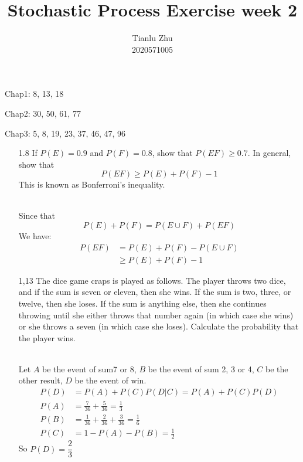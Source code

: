 \documentclass[en,hazy,blue,12pt,device = normal]{elegantnote}
\title{Stochastic Process Exercise week 2}
\author{Tianlu Zhu \\ 2020571005}
\date{}
\begin{document}
\maketitle
Chap1: 8, 13, 18

   Chap2: 30, 50, 61, 77

   Chap3: 5, 8, 19, 23, 37, 46, 47, 96

\begin{enumerate}
    \item[1.8] If $P(E)=0.9$ and $P(F)=0.8$, show that $P(E F) \geq 0.7$. In general, show that
    $$
    P(E F) \geq P(E)+P(F)-1
    $$
    This is known as Bonferroni's inequality.
    \begin{tcolorbox}
        \sol\\
        Since that \[P(E) + P(F) = P(E\cup F) + P(EF)\]
        We have:
        \begin{align*}
            P(EF)&=P(E) + P(F) - P(E\cup F)\\
            &\geq P(E) + P(F) - 1
        \end{align*}
    \end{tcolorbox}

    \item[1,13] The dice game craps is played as follows. The player throws two dice, and if the sum is seven or eleven, then she wins. If the sum is two, three, or twelve, then she loses. If the sum is anything else, then she continues throwing until she either throws that number again (in which case she wins) or she throws a seven (in which case she loses). Calculate the probability that the player wins.
    \begin{tcolorbox}
        \sol \\
        Let \(A\) be the event of sum7 or 8, \(B\) be the event of sum 2, 3 or 4, \(C\) be the other result, \(D\) be the event of win.
        \begin{align*}
            P(D) &= P(A) + P(C) P(D|C) = P(A) + P(C)P(D)\\
            P(A) &= \frac{7}{36} + \frac{5}{36} = \frac{1}{3}\\
            P(B) &= \frac{1}{36} + \frac{2}{36} + \frac{3}{36} = \frac{1}{6}\\
            P(C) &= 1-P(A)-P(B) = \frac{1}{2}
        \end{align*}
        So \(P(D) = \dfrac{2}{3}\)





\end{tcolorbox}
\end{enumerate}
\end{document}
